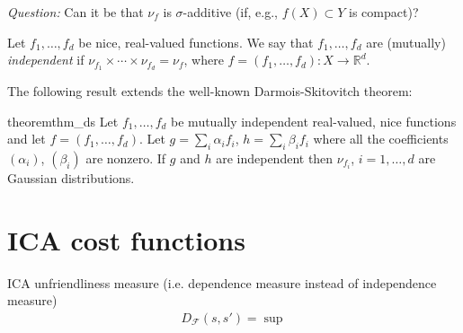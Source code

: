 \documentclass[12pt]{article}
\newcommand{\todoc}[2][]{\todo[color=Apricot,#1]{#2}}
\newcommand{\ra}{\rightarrow}
\newcommand{\real}{\mathbb{R}}
\begin{document}
\emph{Question:} Can it be that $\nu_f$ is $\sigma$-additive (if, e.g., $f(X)\subset Y$ is compact)?


Let $f_1,\ldots, f_d$ be nice, real-valued functions.
We say that $f_1,\ldots, f_d$ are (mutually) \emph{independent}
 if $\nu_{f_1} \times \cdots \times \nu_{f_d} = \nu_f$, where $f = (f_1,\ldots, f_d):X\ra \real^d$.

The following result extends the well-known Darmois-Skitovitch theorem:
\begin{restatable}{theorem}{thm_ds}
Let $f_1,\ldots,f_d$ be mutually independent real-valued, nice functions and let $f = (f_1,\ldots,f_d)$.
Let $g = \sum_i \alpha_i f_i$, $h = \sum_i \beta_i f_i$ where all the coefficients $(\alpha_i)$, $(\beta_i)$ are nonzero.
If $g$ and $h$ are independent then $\nu_{f_i}$, $i=1,\ldots,d$ are Gaussian distributions.
\end{restatable}


\section{ICA cost functions}
ICA unfriendliness measure (i.e. dependence measure instead of independence measure)
\begin{eqnarray*}
D_{\mathcal{F}}(s,s')=\sup
\end{eqnarray*}
\end{document}
